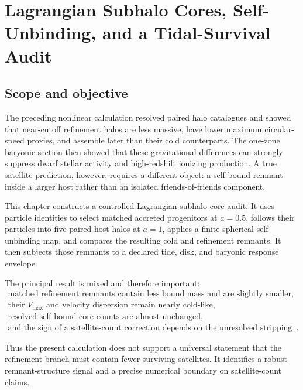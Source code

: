 \chapter{Lagrangian Subhalo Cores, Self-Unbinding, and a Tidal-Survival Audit}
\label{ch:subhalo-core-tidal-audit}


\section{Scope and objective}

The preceding nonlinear calculation resolved paired halo catalogues and showed that near-cutoff refinement halos are less massive, have lower maximum circular-speed proxies, and assemble later than their cold counterparts.  The one-zone baryonic section then showed that these gravitational differences can strongly suppress dwarf stellar activity and high-redshift ionizing production.  A true satellite prediction, however, requires a different object: a self-bound remnant inside a larger host rather than an isolated friends-of-friends component.

This chapter constructs a controlled Lagrangian subhalo-core audit.  It uses particle identities to select matched accreted progenitors at $a=0.5$, follows their particles into five paired host halos at $a=1$, applies a finite spherical self-unbinding map, and compares the resulting cold and refinement remnants.  It then subjects those remnants to a declared tide, disk, and baryonic response envelope.

The principal result is mixed and therefore important:
\begin{equation}
\boxed{
\begin{gathered}
\text{matched refinement remnants contain less bound mass and are slightly smaller},\\
\text{their }V_{\max}\text{ and velocity dispersion remain nearly cold-like},\\
\text{resolved self-bound core counts are almost unchanged},\\
\text{and the sign of a satellite-count correction depends on the unresolved stripping model}.
\end{gathered}}
\label{eq:sct-central-result}
\end{equation}

Thus the present calculation does not support a universal statement that the refinement branch must contain fewer surviving satellites.  It identifies a robust remnant-structure signal and a precise numerical boundary on satellite-count claims.

